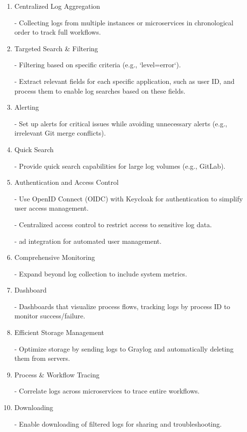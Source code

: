 \documentclass[../main.tex]{subfiles}
\begin{document}
\begin{enumerate}
    \item Centralized Log Aggregation

    - Collecting logs from multiple instances or microservices in chronological order to track full workflows.  

   \item Targeted Search \& Filtering
   
   - Filtering based on specific criteria (e.g., `level=error`).

   - Extract relevant fields for each specific application, such as user ID, and process them to enable log searches based on these fields.

   \item Alerting

   - Set up alerts for critical issues while avoiding unnecessary alerts (e.g., irrelevant Git merge conflicts).

   \item Quick Search

    - Provide quick search capabilities for large log volumes (e.g., GitLab).

   \item Authentication and Access Control

   - Use OpenID Connect (OIDC) with Keycloak for authentication to simplify user access management.
    
   - Centralized access control to restrict access to sensitive log data.
   
   - \gls{ad} integration for automated user management.

   \item Comprehensive Monitoring
   
   - Expand beyond log collection to include system metrics.  
   
   \item Dashboard
   
    -  Dashboards that visualize process flows, tracking logs by process ID to monitor success/failure.

    \item Efficient Storage Management
    
   - Optimize storage by sending logs to Graylog and automatically deleting them from servers.

   \item Process \& Workflow Tracing
   
   - Correlate logs across microservices to trace entire workflows.

   \item Downloading
   
   - Enable downloading of filtered logs for sharing and troubleshooting.

\end{enumerate}
\end{document}
